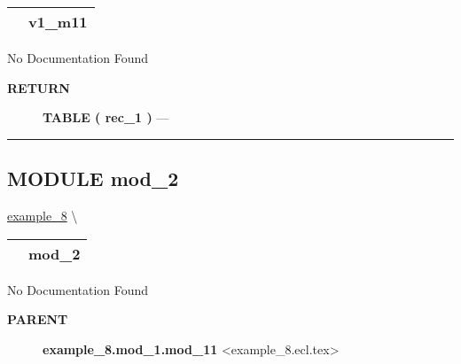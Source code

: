 {\renewcommand{\arraystretch}{1.5}
\begin{tabularx}{\textwidth}{|>{\raggedright\arraybackslash}l|X|}
\hline
\hspace{0pt}\mytexttt{\color{red} } & \textbf{v1\_m11} \\
\hline
\end{tabularx}
}

\par





No Documentation Found








\par
\begin{description}
\item [\colorbox{tagtype}{\color{white} \textbf{\textsf{RETURN}}}] \textbf{TABLE ( rec\_1 )} --- 
\end{description}




\rule{\linewidth}{0.5pt}




\subsection*{\textsf{\colorbox{headtoc}{\color{white} MODULE}
mod\_2}}

\hypertarget{ecldoc:example_8.mod_2}{}
\hspace{0pt} \hyperlink{ecldoc:example_8}{example_8} \textbackslash 

{\renewcommand{\arraystretch}{1.5}
\begin{tabularx}{\textwidth}{|>{\raggedright\arraybackslash}l|X|}
\hline
\hspace{0pt}\mytexttt{\color{red} } & \textbf{mod\_2} \\
\hline
\end{tabularx}
}

\par





No Documentation Found










\par
\begin{description}
\item [\colorbox{tagtype}{\color{white} \textbf{\textsf{PARENT}}}] \textbf{example\_8.mod\_1.mod\_11} <example\_8.ecl.tex>
\end{description}


